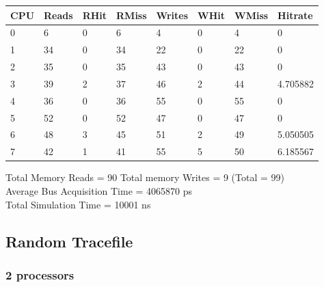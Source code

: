 \documentclass[]{article}
\begin{document}
\begin{table}[H]
	\begin{tabular}{|l|l|l|l|l|l|l|l|}
		\hline
		\textbf{CPU} & \textbf{Reads} & \textbf{RHit} & \textbf{RMiss} & \textbf{Writes} & \textbf{WHit} & \textbf{WMiss} & \textbf{Hitrate} \\ \hline
		0            & 6              & 0             & 6              & 4               & 0             & 4              & 0                \\ \hline
		1            & 34             & 0             & 34             & 22              & 0             & 22             & 0                \\ \hline
		2            & 35             & 0             & 35             & 43              & 0             & 43             & 0                \\ \hline
		3            & 39             & 2             & 37             & 46              & 2             & 44             & 4.705882         \\ \hline
		4            & 36             & 0             & 36             & 55              & 0             & 55             & 0                \\ \hline
		5            & 52             & 0             & 52             & 47              & 0             & 47             & 0                \\ \hline
		6            & 48             & 3             & 45             & 51              & 2             & 49             & 5.050505         \\ \hline
		7            & 42             & 1             & 41             & 55              & 5             & 50             & 6.185567         \\ \hline
	\end{tabular}
\end{table}

Total Memory Reads = 90 Total memory Writes = 9 (Total = 99)\\
Average Bus Acquisition Time = 4065870 ps\\
Total Simulation Time = 10001 ns

\subsection{Random Tracefile}

\subsubsection{2 processors}
\end{document}
